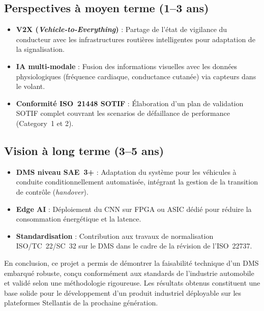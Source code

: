 \documentclass[12pt,a4paper]{report}
\begin{document}
\subsection{Perspectives \`a moyen terme (1--3 ans)}

\begin{itemize}
  \item \textbf{V2X (\textit{Vehicle-to-Everything})} : Partage de l'\'etat de vigilance du conducteur avec les infrastructures routières intelligentes pour adaptation de la signalisation.
  \item \textbf{IA multi-modale} : Fusion des informations visuelles avec les donn\'ees physiologiques (fr\'equence cardiaque, conductance cutan\'ee) via capteurs dans le volant.
  \item \textbf{Conformit\'e ISO~21448 SOTIF} : \'Elaboration d'un plan de validation SOTIF complet couvrant les scenarios de d\'efaillance de performance (Category~1 et 2).
\end{itemize}

\subsection{Vision \`a long terme (3--5 ans)}

\begin{itemize}
  \item \textbf{DMS niveau SAE~3+} : Adaptation du syst\`eme pour les v\'ehicules \`a conduite conditionnellement automatis\'ee, int\'egrant la gestion de la transition de contr\^ole (\textit{handover}).
  \item \textbf{Edge AI} : D\'eploiement du CNN sur FPGA ou ASIC d\'edi\'e pour r\'eduire la consommation \'energ\'etique et la latence.
  \item \textbf{Standardisation} : Contribution aux travaux de normalisation ISO/TC~22/SC~32 sur le DMS dans le cadre de la r\'evision de l'ISO~22737.
\end{itemize}

\vspace{1cm}

En conclusion, ce projet a permis de d\'emontrer la faisabilit\'e technique d'un DMS embarqu\'e robuste, con\c{c}u conform\'ement aux standards de l'industrie automobile et valid\'e selon une m\'ethodologie rigoureuse. Les r\'esultats obtenus constituent une base solide pour le d\'eveloppement d'un produit industriel d\'eployable sur les plateformes Stellantis de la prochaine g\'en\'eration.
\end{document}
